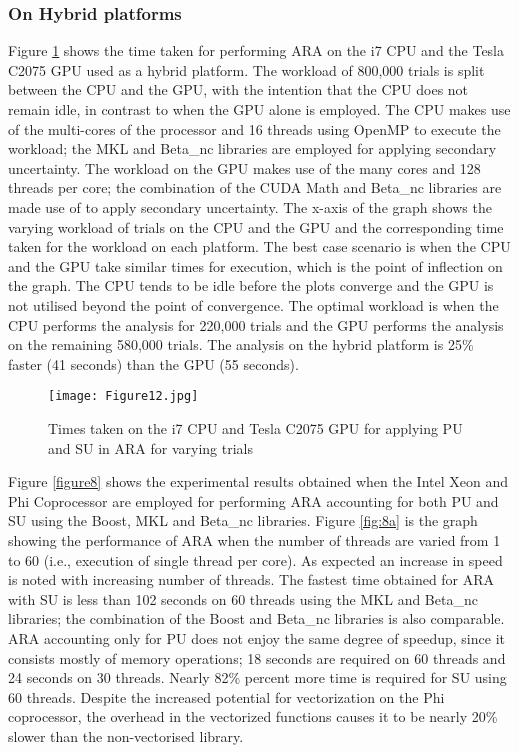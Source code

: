 \subsubsection{On Hybrid platforms}



Figure \ref{figure12} shows the time taken for performing ARA on the i7 CPU and the Tesla C2075 GPU used as a hybrid platform. 
The workload of 800,000 trials is split between the CPU and the GPU, with the intention that the CPU does not remain idle, in contrast to when the GPU alone is employed. 
The CPU makes use of the multi-cores of the processor and 16 threads using OpenMP to execute the workload; the MKL and Beta\_nc libraries are employed for applying secondary uncertainty. 
The workload on the GPU makes use of the many cores and 128 threads per core; the combination of the CUDA Math and Beta\_nc libraries are made use of to apply secondary uncertainty. 
The x-axis of the graph shows the varying workload of trials on the CPU and the GPU and the corresponding time taken for the workload on each platform. 
The best case scenario is when the CPU and the GPU take similar times for execution, which is the point of inflection on the graph. 
The CPU tends to be idle before the plots converge and the GPU is not utilised beyond the point of convergence. 
The optimal workload is when the CPU performs the analysis for 220,000 trials and the GPU performs the analysis on the remaining 580,000 trials. The analysis on the hybrid platform is 25\% faster (41 seconds) than the GPU (55 seconds). 

\begin{figure}
	\centering
	\texttt{[image: Figure12.jpg]}
	\caption{Times taken on the i7 CPU and Tesla C2075 GPU for applying PU and SU in ARA for varying trials}
	\label{figure12}
\end{figure}





Figure \ref{figure8} shows the experimental results obtained when the Intel Xeon and Phi Coprocessor are employed for performing ARA accounting for both PU and SU using the Boost, MKL and Beta\_nc libraries. 
Figure \ref{fig:8a} is the graph showing the performance of ARA when the number of threads are varied from 1 to 60 (i.e., execution of single thread per core). 
As expected an increase in speed is noted with increasing number of threads. 
The fastest time obtained for ARA with SU is less than 102 seconds on 60 threads using the MKL and Beta\_nc libraries; the combination of the Boost and Beta\_nc libraries is also comparable.
ARA accounting only for PU does not enjoy the same degree of speedup, since it consists mostly of memory operations; 18 seconds are required on 60 threads and 24 seconds on 30 threads. 
Nearly 82\% percent more time is required for SU using 60 threads. Despite the increased potential for vectorization on the Phi coprocessor, the overhead in the vectorized functions causes it to be nearly 20\% slower than the non-vectorised library. 

